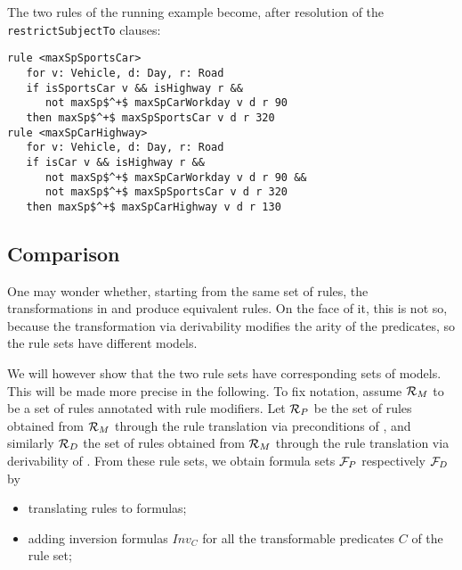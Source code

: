 \begin{example} The two rules of the running example become, after resolution
  of the \texttt{restrictSubjectTo} clauses:
\begin{lstlisting}[mathescape=true]
rule <maxSpSportsCar>
   for v: Vehicle, d: Day, r: Road
   if isSportsCar v && isHighway r &&
      not maxSp$^+$ maxSpCarWorkday v d r 90
   then maxSp$^+$ maxSpSportsCar v d r 320
rule <maxSpCarHighway>
   for v: Vehicle, d: Day, r: Road
   if isCar v && isHighway r &&
      not maxSp$^+$ maxSpCarWorkday v d r 90 &&
      not maxSp$^+$ maxSpSportsCar v d r 320
   then maxSp$^+$ maxSpCarHighway v d r 130
\end{lstlisting}
\end{example}



\subsection{Comparison}\label{sec:comparison}

One may wonder whether, starting from the same set of rules, the transformations in
 and  produce
equivalent rules. On the face of it, this is not so, because the
transformation via derivability modifies the arity of the predicates, so the
rule sets have different models.

We will however show that the two rule sets have corresponding sets of
models. This will be made more precise in the following. To fix notation,
assume ${\cal R}_M$ to be a set of rules annotated with rule modifiers. Let
${\cal R}_P$ be the set of rules obtained from ${\cal R}_M$ through the rule
translation via preconditions of , and similarly
${\cal R}_D$ the set of rules obtained from ${\cal R}_M$ through the rule
translation via derivability of . From these rule
sets, we obtain formula sets ${\cal F}_P$ respectively ${\cal F}_D$ by
\begin{itemize}
\item translating rules to formulas;
\item adding inversion formulas $Inv_C$ for all
  the transformable predicates $C$ of the rule set;
\end{itemize}


